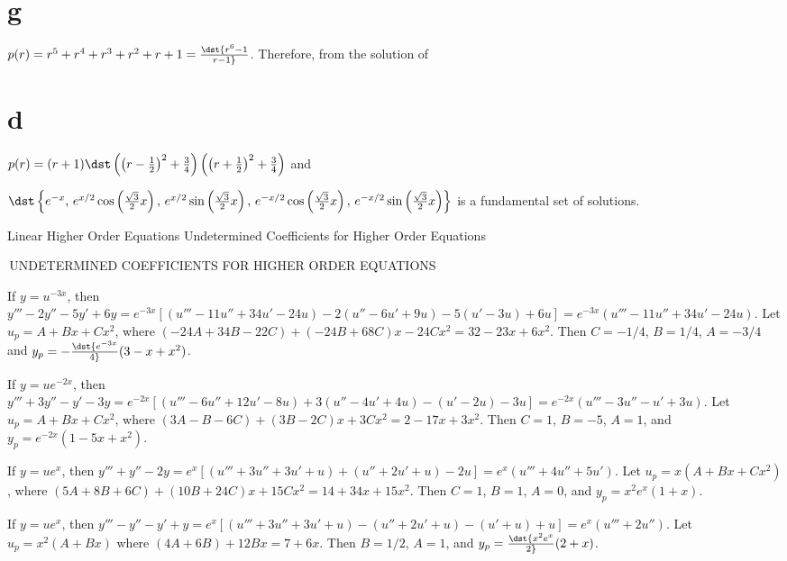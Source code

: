 \documentclass[dvips]{book}
\renewcommand{\exer}[1]{\par\medskip\;\noindent{\color{red}\bf #1.}}
\numberwithin{example}{section}
\numberwithin{equation}{section}
\numberwithin{theorem}{section}
\numberwithin{table}{section}
\numberwithin{figure}{section}
\begin{document}
\part{g}
$p(r)=r^5+r^4+r^3+r^2+r+1=\dst{r^6-1\over r-1}$. Therefore,
from the solution of \part{d}
$p(r)=(r+1)\dst\left(\left(r-{1\over2}\right)^2+{3\over4}\right)
\left(\left(r+{1\over2}\right)^2+{3\over4}\right)$ and

$\dst\left\{e^{-x}
,\,e^{x/2}\cos\left({\sqrt3\over2}x\right),
\,e^{x/2}\sin\left({\sqrt3\over2}x\right),
\,e^{-x/2}\cos\left({\sqrt3\over2}x\right),
\,e^{-x/2}\sin\left({\sqrt3\over2}x\right)\right\}$
is a fundamental set of solutions.



 {Linear Higher Order Equations}
{Undetermined Coefficients for Higher Order  Equations}

\renewcommand{\thissection}{\sectiontitle
{\,UNDETERMINED COEFFICIENTS FOR HIGHER ORDER  EQUATIONS}}
\thissection

\vspace*{-17.5pt}



\exer{9.3.2} If $y=u^{-3x}$, then $y'''-2y''-5y'+6y=e^{-3x}[
(u'''-11u''+34u'-24u)-2(u''-6u'+9u)-5(u'-3u)+6u]
=e^{-3x}(u'''-11u''+34u'-24u)$. Let $u_p=A+Bx+Cx^2$, where
$(-24A+34B-22C)+(-24B+68C)x-24Cx^2=32-23x+6x^2$. Then $C=-1/4$,
$B=1/4$, $A=-3/4$ and $y_p=-\dst{e^{-3x}\over4}(3-x+x^2)$.



\exer{9.3.4} If $y=ue^{-2x}$, then $y'''+3y''-y'-3y=e^{-2x}[
(u'''-6u''+12u'-8u)+ 3(u''-4u'+4u) -(u'-2u) -3u]
=e^{-2x}(u'''-3u''-u'+3u)$. Let $u_p=A+Bx+Cx^2$, where $(3A-B-6C)+
(3B-2C)x +3Cx^2=2-17x+3x^2$. Then $C=1$, $B=-5$, $A=1$, and
$y_p=e^{-2x}(1-5x+x^2)$.




\exer{9.3.6} If $y=ue^x$, then $y'''+y''-2y=e^x[
(u'''+3u''+3u'+u) +(u''+2u'+u) -2u]= e^x(u'''+4u''+5u')$. Let
$u_p=x(A+Bx+Cx^2)$, where $(5A+8B+6C) +(10B+24C)x +15Cx^2
=14+34x+15x^2$. Then $C=1$, $B=1$, $A=0$, and $y_p=x^2e^x(1+x)$.


\exer{9.3.8} If $y=ue^x$, then $y'''-y''-y'+y=e^x[
(u'''+3u''+3u'+u) -(u''+2u'+u) -(u'+u) +u]= e^x(u'''+2u'')$. Let
$u_p=x^2(A+Bx)$ where $(4A+6B)+12Bx= 7+6x$. Then $B=1/2$, $A=1$, and
$y_p=\dst{x^2e^x\over2}(2+x)$.
\end{document}
